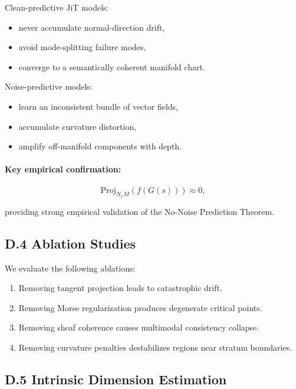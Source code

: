 \documentclass[11pt,a4paper,twocolumn]{article}
\begin{document}
Clean-predictive JiT models:
\begin{itemize}
\item never accumulate normal-direction drift,
\item avoid mode-splitting failure modes,
\item converge to a semantically coherent manifold chart.
\end{itemize}

Noise-predictive models:
\begin{itemize}
\item learn an inconsistent bundle of vector fields,
\item accumulate curvature distortion,
\item amplify off-manifold components with depth.
\end{itemize}

\paragraph{Key empirical confirmation:}

\[
\mathrm{Proj}_{N_xM}(f(G(s))) \approx 0,
\]

providing strong empirical validation of the No-Noise Prediction Theorem.


\subsection*{D.4 Ablation Studies}

We evaluate the following ablations:
\begin{enumerate}
\item Removing tangent projection leads to catastrophic drift.
\item Removing Morse regularization produces degenerate critical points.
\item Removing sheaf coherence causes multimodal consistency collapse.
\item Removing curvature penalties destabilizes regions near stratum boundaries.
\end{enumerate}


\subsection*{D.5 Intrinsic Dimension Estimation}
\end{document}
